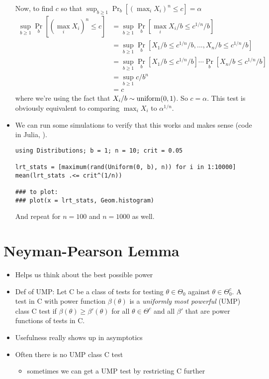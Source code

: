 \begin{itemize}[leftmargin=0pt]
\begin{ex}
    Now, to find $c$ so that $\sup_{b \geq 1} \Pr_b[(\max_i X_i)^n \leq c] = \alpha$
    \begin{align*}
      \sup_{b \geq 1} \Pr_b[(\max_i X_i)^n \leq c]
      &= \sup_{b\geq 1} \Pr_b[\max_i X_i/b \leq c^{1/n}/b] \\
      &= \sup_{b \geq 1} \Pr_b[X_1/b \leq c^{1/n}/b, ..., X_n/b \leq c^{1/n}/b] \\
      &= \sup_{b \geq 1} \Pr_b[X_1/b \leq c^{1/n}/b] \cdots \Pr_b[X_n/b \leq c^{1/n}/b] \\
      &= \sup_{b \geq 1} c/b^n \\
      &= c
    \end{align*}
    where we're using the fact that $X_i/b \sim \operatorname{uniform}(0,1)$.  So
    $c=\alpha$.  This test is obviously equivalent to comparing $\max_i
    X_i$ to $\alpha^{1/n}$.
  \end{ex}

\item We can run some simulations to verify that this works and makes
  sense (code in Julia, \citealp{BKS12}).
  \begin{Verbatim}
using Distributions; b = 1; n = 10; crit = 0.05

lrt_stats = [maximum(rand(Uniform(0, b), n)) for i in 1:10000]
mean(lrt_stats .<= crit^(1/n))

### to plot:
### plot(x = lrt_stats, Geom.histogram)
  \end{Verbatim}
  And repeat for $n = 100$ and $n = 1000$ as well.
\end{itemize}

\section{Neyman-Pearson Lemma}

\begin{itemize}[leftmargin=0pt]
\item Helps us think about the best possible power
\item Def of UMP: Let C be a class of tests for testing $\theta \in \Theta_0$
  against $\theta \in \Theta_0^c$.  A test in C with power function $\beta(\theta)$ is a
  \emph{uniformly most powerful} (UMP) class C test if $\beta(\theta) \geq \beta'(\theta)$
  for all $\theta \in \Theta^c$ and all $\beta'$ that are power functions of tests in
  C.
\item Usefulness really shows up in asymptotics
\item Often there is no UMP class C test
\begin{itemize}
\item sometimes we can get a UMP test by restricting C further
\end{itemize}
\end{itemize}

